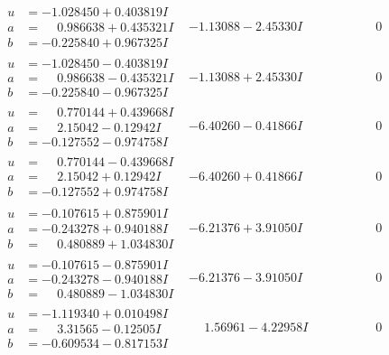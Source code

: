 \documentclass[1p]{elsarticle_modified}
\theoremstyle{definition}
\begin{document}
$$\begin{array}{c|c|c}
\begin{aligned}
u &= -1.028450 + 0.403819 I \\
a &= \phantom{-}0.986638 + 0.435321 I \\
b &= -0.225840 + 0.967325 I\end{aligned}
 & -1.13088 - 2.45330 I & \phantom{-0.000000 } 0 \\ \hline\begin{aligned}
u &= -1.028450 - 0.403819 I \\
a &= \phantom{-}0.986638 - 0.435321 I \\
b &= -0.225840 - 0.967325 I\end{aligned}
 & -1.13088 + 2.45330 I & \phantom{-0.000000 } 0 \\ \hline\begin{aligned}
u &= \phantom{-}0.770144 + 0.439668 I \\
a &= \phantom{-}2.15042 - 0.12942 I \\
b &= -0.127552 - 0.974758 I\end{aligned}
 & -6.40260 - 0.41866 I & \phantom{-0.000000 } 0 \\ \hline\begin{aligned}
u &= \phantom{-}0.770144 - 0.439668 I \\
a &= \phantom{-}2.15042 + 0.12942 I \\
b &= -0.127552 + 0.974758 I\end{aligned}
 & -6.40260 + 0.41866 I & \phantom{-0.000000 } 0 \\ \hline\begin{aligned}
u &= -0.107615 + 0.875901 I \\
a &= -0.243278 + 0.940188 I \\
b &= \phantom{-}0.480889 + 1.034830 I\end{aligned}
 & -6.21376 + 3.91050 I & \phantom{-0.000000 } 0 \\ \hline\begin{aligned}
u &= -0.107615 - 0.875901 I \\
a &= -0.243278 - 0.940188 I \\
b &= \phantom{-}0.480889 - 1.034830 I\end{aligned}
 & -6.21376 - 3.91050 I & \phantom{-0.000000 } 0 \\ \hline\begin{aligned}
u &= -1.119340 + 0.010498 I \\
a &= \phantom{-}3.31565 - 0.12505 I \\
b &= -0.609534 - 0.817153 I\end{aligned}
 & \phantom{-}1.56961 - 4.22958 I & \phantom{-0.000000 } 0 \\ \hline\begin{aligned}

\end{aligned}
\end{array}$$
\end{document}

